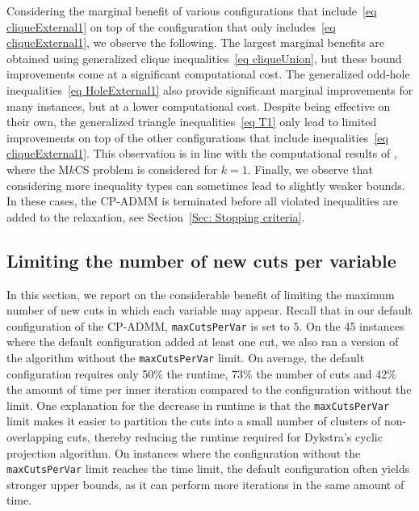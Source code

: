 \documentclass[11pt, a4paper]{article}
\begin{document}
Considering the marginal benefit of various configurations that include~\eqref{eq cliqueExternal1} on top of the configuration that only includes~\eqref{eq cliqueExternal1}, we observe the following.
The largest marginal benefits are obtained using generalized clique inequalities~\eqref{eq cliqueUnion}, but these bound improvements come at a significant computational cost. 
The generalized odd-hole inequalities~\eqref{eq HoleExternal1} also provide significant marginal improvements for many instances, but at a lower computational cost.
Despite being effective on their own, the generalized triangle inequalities~\eqref{eq T1} only lead to limited improvements on top of the other configurations that include inequalities~\eqref{eq cliqueExternal1}. 
This observation is in line with the computational results of \cite{Pucher2025PracticalExperience}, where the M$k$CS problem is considered for $k=1$.
Finally, we observe that considering more inequality types can sometimes lead to slightly weaker bounds. 
In these cases, the CP-ADMM is terminated before all violated inequalities are added to the relaxation, see Section~\ref{Sec: Stopping criteria}.

\subsection{Limiting the number of new cuts per variable} \label{Sec: maxCutsPerVar}
In this section, we report on the considerable benefit of limiting the maximum number of new cuts in which each variable may appear. 
Recall that in our default configuration of the CP-ADMM, \texttt{maxCutsPerVar} is set to $5$.
On the 45 instances where the default configuration added at least one cut, we also ran a version of the algorithm without the \texttt{maxCutsPerVar} limit.
On average, the default configuration requires only 50\% the runtime, 73\% the number of cuts and 42\% the amount of time per inner iteration compared to the configuration without the limit. 
One explanation for the decrease in runtime is that the \texttt{maxCutsPerVar} limit makes it easier to partition the cuts into a small number of clusters of non-overlapping cuts, thereby reducing the runtime required for Dykstra's cyclic projection algorithm.
On instances where the configuration without the \texttt{maxCutsPerVar} limit reaches the time limit, the default configuration often yields stronger upper bounds, as it can perform more iterations in the same amount of time.
\end{document}
